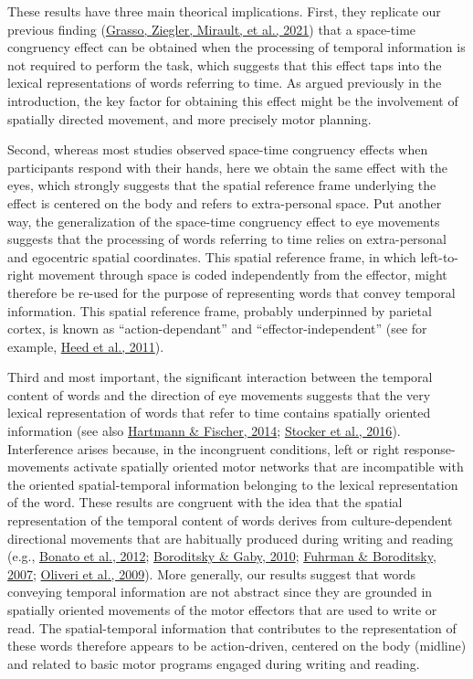 \documentclass[
  a4paper,12pt,twoside,onecolumn,openright,final,oldfontcommands]{memoir}
\begin{document}
These results have three main theorical implications. First, they replicate our previous finding (\protect\hyperlink{ref-grasso_as_2021}{Grasso, Ziegler, Mirault, et al., 2021}) that a space-time congruency effect can be obtained when the processing of temporal information is not required to perform the task, which suggests that this effect taps into the lexical representations of words referring to time. As argued previously in the introduction, the key factor for obtaining this effect might be the involvement of spatially directed movement, and more precisely motor planning.

Second, whereas most studies observed space-time congruency effects when participants respond with their hands, here we obtain the same effect with the eyes, which strongly suggests that the spatial reference frame underlying the effect is centered on the body and refers to extra-personal space. Put another way, the generalization of the space-time congruency effect to eye movements suggests that the processing of words referring to time relies on extra-personal and egocentric spatial coordinates. This spatial reference frame, in which left-to-right movement through space is coded independently from the effector, might therefore be re-used for the purpose of representing words that convey temporal information. This spatial reference frame, probably underpinned by parietal cortex, is known as ``action-dependant'' and ``effector-independent'' (see for example, \protect\hyperlink{ref-heed_functional_2011}{Heed et al., 2011}).

Third and most important, the significant interaction between the temporal content of words and the direction of eye movements suggests that the very lexical representation of words that refer to time contains spatially oriented information (see also \protect\hyperlink{ref-hartmann_pupillometry_2014}{Hartmann \& Fischer, 2014}; \protect\hyperlink{ref-stocker_eye_2016}{Stocker et al., 2016}). Interference arises because, in the incongruent conditions, left or right response-movements activate spatially oriented motor networks that are incompatible with the oriented spatial-temporal information belonging to the lexical representation of the word. These results are congruent with the idea that the spatial representation of the temporal content of words derives from culture-dependent directional movements that are habitually produced during writing and reading (e.g., \protect\hyperlink{ref-bonato_when_2012}{Bonato et al., 2012}; \protect\hyperlink{ref-boroditsky_remembrances_2010}{Boroditsky \& Gaby, 2010}; \protect\hyperlink{ref-fuhrman_mental_2007}{Fuhrman \& Boroditsky, 2007}; \protect\hyperlink{ref-oliveri_representation_2009}{Oliveri et al., 2009}). More generally, our results suggest that words conveying temporal information are not abstract since they are grounded in spatially oriented movements of the motor effectors that are used to write or read. The spatial-temporal information that contributes to the representation of these words therefore appears to be action-driven, centered on the body (midline) and related to basic motor programs engaged during writing and reading.
\end{document}
